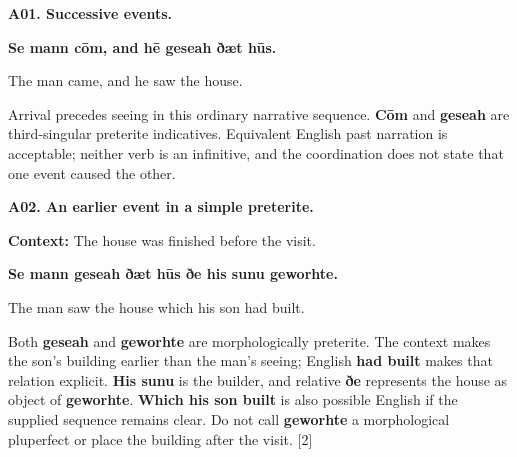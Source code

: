 \par\begin{minipage}{\linewidth}\raggedright
\textbf{A01. Successive events.}

\textbf{Se mann cōm, and hē geseah ðæt hūs.}

The man came, and he saw the house.

Arrival precedes seeing in this ordinary narrative sequence. \textbf{Cōm} and \textbf{geseah} are third-singular preterite indicatives. Equivalent English past narration is acceptable; neither verb is an infinitive, and the coordination does not state that one event caused the other.

\end{minipage}\par\addvspace{4pt}

\par\begin{minipage}{\linewidth}\raggedright
\textbf{A02. An earlier event in a simple preterite.}

\textbf{Context:} The house was finished before the visit.

\textbf{Se mann geseah ðæt hūs ðe his sunu geworhte.}

The man saw the house which his son had built.

Both \textbf{geseah} and \textbf{geworhte} are morphologically preterite. The context makes the son's building earlier than the man's seeing; English \textbf{had built} makes that relation explicit. \textbf{His sunu} is the builder, and relative \textbf{ðe} represents the house as object of \textbf{geworhte}. \textbf{Which his son built} is also possible English if the supplied sequence remains clear. Do not call \textbf{geworhte} a morphological pluperfect or place the building after the visit. [2]

\end{minipage}\par\addvspace{4pt}

